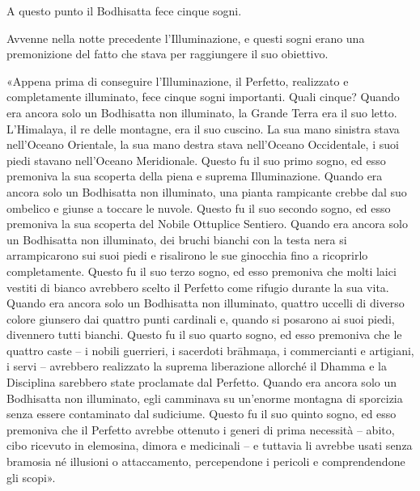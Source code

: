 
 A questo punto il Bodhisatta fece cinque sogni.

 Avvenne nella notte precedente l’Illuminazione, e
questi sogni erano una premonizione del fatto che stava per raggiungere il suo
obiettivo.

 «Appena prima di conseguire l’Illuminazione, il Perfetto,
realizzato e completamente illuminato, fece cinque sogni importanti. Quali
cinque? Quando era ancora solo un Bodhisatta non illuminato, la Grande Terra era
il suo letto. L’Himalaya, il re delle montagne, era il suo cuscino. La sua mano
sinistra stava nell’Oceano Orientale, la sua mano destra stava nell’Oceano
Occidentale, i suoi piedi stavano nell’Oceano Meridionale. Questo fu il suo
primo sogno, ed esso premoniva la sua scoperta della piena e suprema
Illuminazione. Quando era ancora solo un Bodhisatta non illuminato, una pianta
rampicante crebbe dal suo ombelico e giunse a toccare le nuvole. Questo fu il
suo secondo sogno, ed esso premoniva la sua scoperta del Nobile Ottuplice
Sentiero. Quando era ancora solo un Bodhisatta non illuminato, dei bruchi
bianchi con la testa nera si arrampicarono sui suoi piedi e risalirono le sue
ginocchia fino a ricoprirlo completamente. Questo fu il suo terzo sogno, ed esso
premoniva che molti laici vestiti di bianco avrebbero scelto il Perfetto come
rifugio durante la sua vita. Quando era ancora solo un Bodhisatta non
illuminato, quattro uccelli di diverso colore giunsero dai quattro punti
cardinali e, quando si posarono ai suoi piedi, divennero tutti bianchi. Questo
fu il suo quarto sogno, ed esso premoniva che le quattro caste – i nobili
guerrieri, i sacerdoti brāhmaṇa, i commercianti e artigiani, i servi – avrebbero
realizzato la suprema liberazione allorché il Dhamma e la Disciplina sarebbero
state proclamate dal Perfetto. Quando era ancora solo un Bodhisatta non
illuminato, egli camminava su un’enorme montagna di sporcizia senza essere
contaminato dal sudiciume. Questo fu il suo quinto sogno, ed esso premoniva che
il Perfetto avrebbe ottenuto i generi di prima necessità – abito, cibo ricevuto
in elemosina, dimora e medicinali – e tuttavia li avrebbe usati senza bramosia
né illusioni o attaccamento, percependone i pericoli e comprendendone gli
scopi».


